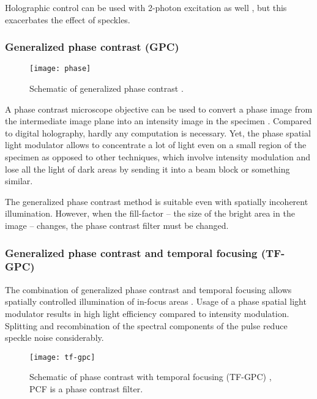 Holographic control can be used with 2-photon excitation as well
\citep{Nikolenko2008}, %
but this exacerbates the effect of speckles.
\subsubsection{Generalized phase contrast (GPC)}
\begin{figure}[!hbt]
  \centering
  \texttt{[image: phase]} %
  \caption{Schematic of generalized phase contrast
    \citep[from][]{Rodrigo2008}.}
  \label{fig:phase}
\end{figure}
A phase contrast microscope objective  can be used to
convert a phase image from the intermediate image plane into an
intensity image in the specimen \citep{Rodrigo2008}. Compared to digital holography, hardly any computation is
necessary. Yet, the phase spatial light modulator allows to
concentrate a lot of light even on a small region of the specimen as
opposed to other techniques, which involve intensity modulation and
lose all the light of dark areas by sending it into a beam block or
something similar.

The generalized phase contrast method is suitable even with spatially
incoherent illumination. However, when the
fill-factor -- the size of the bright area in the image -- changes,
the phase contrast filter must be changed.
\subsubsection{Generalized phase contrast and temporal focusing (TF-GPC)}
The combination of generalized phase contrast and temporal focusing
allows spatially controlled illumination of in-focus areas
\citep{Papagiakoumou2010}. Usage of a phase spatial light modulator
results in high light efficiency compared to intensity modulation.
Splitting and recombination of the spectral components of the pulse
reduce speckle noise considerably.
\begin{figure}[!hbt]
  \centering
  \texttt{[image: tf-gpc]} 
  \caption{Schematic of phase contrast with temporal focusing (TF-GPC)
    \citep[from][]{Papagiakoumou2010}, PCF is a phase contrast filter.}
  \label{fig:tf-gpc}
\end{figure}

